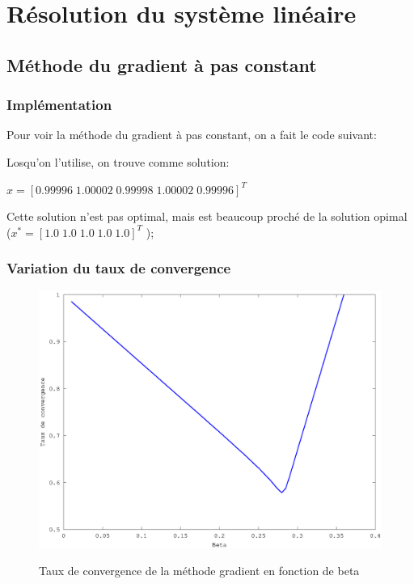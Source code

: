 \documentclass[a4paper,11pt]{article}
\begin{document}
\titleTMB 
\newpage
\tableofcontents
\listoffigures
\newpage

\section{Résolution du système linéaire}

\subsection{Méthode du gradient à pas constant}

\subsubsection{Implémentation}

Pour voir la méthode du gradient à pas constant, on a fait le code suivant:

\begin{multicols}{2}
  
\end{multicols}

Losqu'on l'utilise, on trouve comme solution:

\begin{center}
$x = [ 0.99996 \; 1.00002 \; 0.99998 \; 1.00002 \; 0.99996]^T$
\end{center}

Cette solution n'est pas optimal, mais est beaucoup proché de la solution opimal
($x^* = [ 1.0 \; 1.0 \; 1.0 \; 1.0 \; 1.0]^T$
);

\subsubsection{Variation du taux de convergence}

\begin{figure}[h!]
  \begin{centering}
    \includegraphics[scale=0.5]{../grad_beta}
    \label{rspro2}
    \par\end{centering}
  \caption{Taux de convergence de la méthode gradient en fonction de beta}
  \label{fig:jacobi-conv}
\end{figure}
\end{document}
